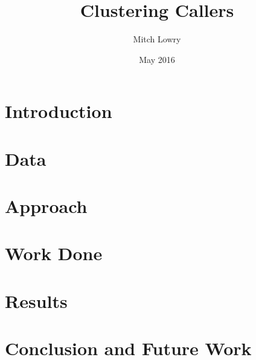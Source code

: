 \documentclass{article}
\title{Clustering Callers}
\author{Mitch Lowry}
\date{May 2016}
\providecommand{\main}{.}
\begin{document}
\providecommand{\main}{..}
\maketitle

\section{Introduction}


\section{Data}


\section{Approach}


\section{Work Done}


\section{Results}


%

\section{Conclusion and Future Work}


\printbibliography
\end{document}

